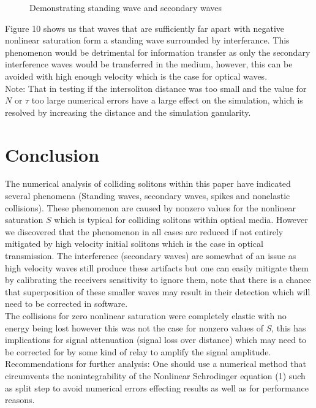 \documentclass{article}
\begin{document}
\begin{enumerate}
\begin{figure}
\caption{Demonstrating standing wave and secondary waves}
\end{figure}
Figure 10 shows us that waves that are sufficiently far apart with negative nonlinear saturation form a standing wave surrounded by interferance. This phenomenon would be detrimental for information transfer as only the secondary interference waves would be transferred in the medium, however, this can be avoided with high enough velocity which is the case for optical waves. \\
Note: That in testing if the intersoliton distance was too small and the value for $N$ or $\tau$ too large numerical errors have a large effect on the simulation, which is resolved by increasing the distance and the simulation ganularity. 
\end{enumerate}
\section{Conclusion}
The numerical analysis of colliding solitons within this paper have indicated several phenomena (Standing waves, secondary waves, spikes and nonelastic collisions). These phenomenon are caused by nonzero values for the nonlinear saturation $S$ which is typical for colliding solitons within optical media. However we discovered that the phenomenon in all cases are reduced if not entirely mitigated by high velocity initial solitons which is the case in optical transmission. The interference (secondary waves) are somewhat of an issue as high velocity waves still produce these artifacts but one can easily mitigate them by calibrating the receivers sensitivity to ignore them, note that there is a chance that superposition of these smaller waves may result in their detection which will need to be corrected in software. \\
The collisions for zero nonlinear saturation were completely elastic with no energy being lost however this was not the case for nonzero values of $S$, this has implications for signal attenuation (signal loss over distance) which may need to be corrected for by some kind of relay to amplify the signal amplitude. \\
Recommendations for further analysis: One should use a numerical method that circumvents the nonintegrability of the Nonlinear Schrodinger equation (1) such as split step to avoid numerical errors effecting results as well as for performance reasons. 
\end{document}
